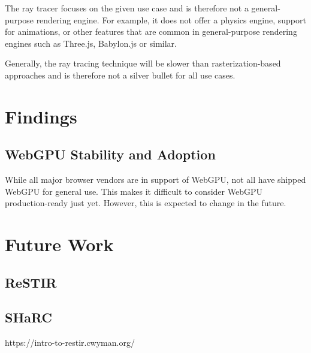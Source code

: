 
The ray tracer focuses on the given use case and is therefore not a general-purpose rendering engine. For example, it does not offer a physics engine, support for animations, or other features that are common in general-purpose rendering engines such as Three.js, Babylon.js or similar.

Generally, the ray tracing technique will be slower than rasterization-based approaches and is therefore not a silver bullet for all use cases.

\section{Findings}
\subsection{WebGPU Stability and Adoption}

While all major browser vendors are in support of WebGPU, not all have shipped WebGPU for general use. This makes it difficult to consider WebGPU production-ready just yet. However, this is expected to change in the future.

\section{Future Work}
\subsection{ReSTIR}
\subsection{SHaRC}

https://intro-to-restir.cwyman.org/